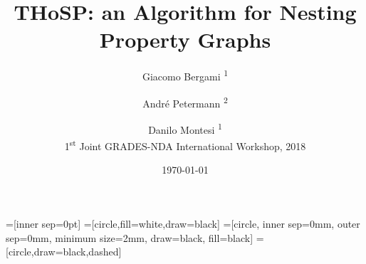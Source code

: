 
\usepackage[T1]{fontenc}
\usepackage[type1]{libertine}
\renewcommand{\ttdefault}{cmtt}

\usepackage{booktabs}
\usepackage{braket}
\usepackage{multirow}




\usepackage{appendixnumberbeamer}

\usepackage[UKenglish]{babel}%
\usepackage[UKenglish]{isodate}%

\title{THoSP: an Algorithm for Nesting Property Graphs}
\date{\today}
\author[G. Bergami et al.]{Giacomo Bergami \textsuperscript{1} \and Andr\'e Petermann \textsuperscript{2} \and Danilo Montesi \textsuperscript{1}\\
1\textsuperscript{st} Joint  GRADES-NDA International Workshop, 2018}

\usepackage{smartdiagram}

\def\ojoin{\setbox0=\hbox{$\bowtie$}%
	\rule[0.2ex]{.27em}{.4pt}\llap{\rule[1ex]{.27em}{.4pt}}}
\def\leftouterjoin{\mathbin{\ojoin\mkern-2mu\Join}}
\def\rightouterjoin{\mathbin{\Join\mkern-3.4mu\ojoin}}
\def\fullouterjoin{\mathbin{\ojoin\mkern-7mu\Join\mkern-7mu\ojoin}}

\usepackage{tcolorbox}

\usepackage{eulervm}
\usepackage[osf,sc]{mathpazo}
\usepackage{inconsolata}
\usetikzlibrary{matrix,fit,calc}
\usepackage{tikz}
\usetikzlibrary{tikzmark,positioning}
\newcommand*{\yellowemph}[1]{%
	\tikz[baseline=(X.base)] \node[rectangle, fill=yellow, rounded corners, inner sep=0.3mm] (X) {#1};%
}
\newcommand*{\greenemph}[1]{%
	\tikz[baseline=(X.base)] \node[rectangle, fill=green, rounded corners, inner sep=0.3mm] (X) {#1};%
}
=[inner sep=0pt]
=[circle,fill=white,draw=black]
=[circle, inner sep=0mm, outer sep=0mm, minimum size=2mm, draw=black, fill=black]
=[circle,draw=black,dashed]
\usetikzlibrary{decorations.pathreplacing}
\usepackage{preview}
\usetikzlibrary{automata,arrows,backgrounds,positioning,fit,calc}

